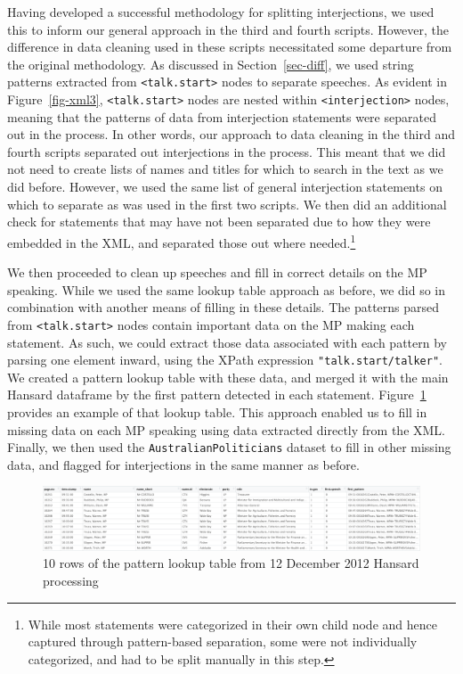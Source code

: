 \documentclass[
  letterpaper,
  DIV=11,
  numbers=noendperiod]{scrartcl}
\begin{document}
Having developed a successful methodology for splitting interjections,
we used this to inform our general approach in the third and fourth
scripts. However, the difference in data cleaning used in these scripts
necessitated some departure from the original methodology. As discussed
in Section~\ref{sec-diff}, we used string patterns extracted from
\texttt{\textless{}talk.start\textgreater{}} nodes to separate speeches.
As evident in Figure~\ref{fig-xml3},
\texttt{\textless{}talk.start\textgreater{}} nodes are nested within
\texttt{\textless{}interjection\textgreater{}} nodes, meaning that the
patterns of data from interjection statements were separated out in the
process. In other words, our approach to data cleaning in the third and
fourth scripts separated out interjections in the process. This meant
that we did not need to create lists of names and titles for which to
search in the text as we did before. However, we used the same list of
general interjection statements on which to separate as was used in the
first two scripts. We then did an additional check for statements that
may have not been separated due to how they were embedded in the XML,
and separated those out where needed.\footnote{While most statements
  were categorized in their own child node and hence captured through
  pattern-based separation, some were not individually categorized, and
  had to be split manually in this step.}

We then proceeded to clean up speeches and fill in correct details on
the MP speaking. While we used the same lookup table approach as before,
we did so in combination with another means of filling in these details.
The patterns parsed from \texttt{\textless{}talk.start\textgreater{}}
nodes contain important data on the MP making each statement. As such,
we could extract those data associated with each pattern by parsing one
element inward, using the XPath expression \texttt{"talk.start/talker"}.
We created a pattern lookup table with these data, and merged it with
the main Hansard dataframe by the first pattern detected in each
statement. Figure~\ref{fig-patterns} provides an example of that lookup
table. This approach enabled us to fill in missing data on each MP
speaking using data extracted directly from the XML. Finally, we then
used the \texttt{AustralianPoliticians} dataset to fill in other missing
data, and flagged for interjections in the same manner as before.

\begin{figure}

{\centering \includegraphics{images/pattern_lookup.png}

}

\caption{\label{fig-patterns}10 rows of the pattern lookup table from 12
December 2012 Hansard processing}

\end{figure}
\end{document}
